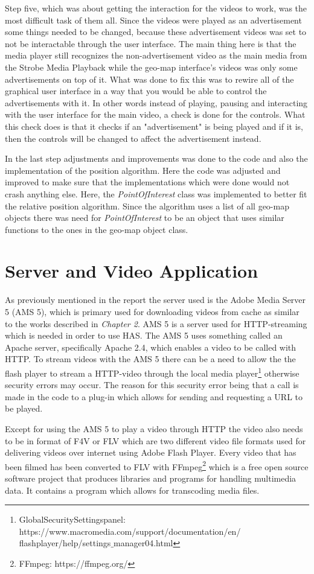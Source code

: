 Step five, which was about getting the interaction for the videos to work, was the most difficult task of them all. Since the videos were played as an advertisement some things needed to be changed, because these advertisement videos was set to not be interactable through the user interface. The main thing here is that the media player still recognizes the non-advertisement video as the main media from the Strobe Media Playback while the geo-map interface's videos was only some advertisements on top of it. What was done to fix this was to rewire all of the graphical user interface in a way that you would be able to control the advertisements with it. In other words instead of playing, pausing and interacting with the user interface for the main video, a check is done for the controls. What this check does is that it checks if an "advertisement" is being played and if it is, then the controls will be changed to affect the advertisement instead.

In the last step adjustments and improvements was done to the code and also the implementation of the position algorithm. Here the code was adjusted and improved to make sure that the implementations which were done would not crash anything else. Here, the \textit{PointOfInterest} class was implemented to better fit the relative position algorithm. Since the algorithm uses a list of all geo-map objects there was need for \textit{PointOfInterest} to be an object that uses similar functions to the ones in the geo-map object class. 

\section{Server and Video Application}
\label{sec:server}

As previously mentioned in the report the server used is the Adobe Media Server 5 (AMS 5), which is primary used for downloading videos from cache as similar to the works described in \textit{Chapter 2}. AMS 5 is a server used for HTTP-streaming which is needed in order to use HAS. The AMS 5 uses something called an Apache server, specifically Apache 2.4, which enables a video to be called with HTTP. To stream videos with the AMS 5 there can be a need to allow the the flash player to stream a HTTP-video through the local media player\footnote{Global\:Security\:Settings\:panel: https://www.macromedia.com/support/documentation/en/\\flashplayer/help/settings$\_$manager04.html} otherwise security errors may occur. The reason for this security error being that a call is made in the code to a plug-in which allows for sending and requesting a URL to be played.

Except for using the AMS 5 to play a video through HTTP the video also needs to be in format of F4V or FLV which are two different video file formats used for delivering videos over internet using Adobe Flash Player. Every video that has been filmed has been converted to FLV with FFmpeg\footnote{FFmpeg: https://ffmpeg.org/} which is a free open source software project that produces libraries and programs for handling multimedia data. It contains a program which allows for transcoding media files.

